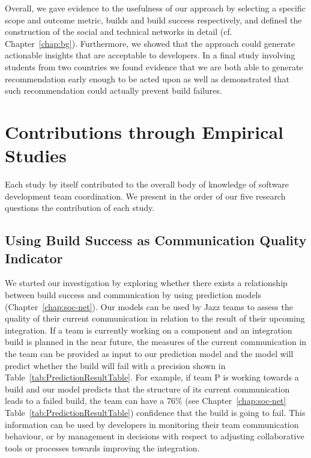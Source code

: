 Overall, we gave evidence to the usefulness of our approach by selecting a specific scope and outcome metric, builds and build success respectively, and defined the construction of the social and technical networks in detail (cf. Chapter~\ref{chap:bg}).
Furthermore, we showed that the approach could generate actionable insights that are acceptable to developers.
In a final study involving students from two countries we found evidence that we are both able to generate recommendation early enough to be acted upon as well as demonstrated that such recommendation could actually prevent build failures.



\section{Contributions through Empirical Studies}
\label{sec:cont:emp}
Each study by itself contributed to the overall body of knowledge of software development team coordination.
We present in the order of our five research questions the contribution of each  study.


\subsection{Using Build Success as Communication Quality Indicator}
\label{subsec:practicalimpl}
%
We started our investigation by exploring whether there exists a relationship between build success and communication by using prediction models (Chapter~\ref{chap:soc-net}).
Our models can be used by Jazz teams to assess the quality of their current
communication in relation to the result of their upcoming integration. If a team
is currently working on a component and an integration build is planned in the
near future, the measures of the current communication in the team can be
provided as input to our prediction model and the model will predict whether the
build will fail with a precision shown in Table~\ref{tab:PredictionResultTable}.
For example, if team P is working towards a build and our model predicts that the
structure of its current communication leads to a failed build, the team can have
a 76\% (see Chapter~\ref{chap:soc-net} Table~\ref{tab:PredictionResultTable}) confidence that the build is
going to fail. This information can be used by developers in monitoring their
team communication behaviour, or by management in decisions with respect to
adjusting collaborative tools or processes towards improving the integration.

